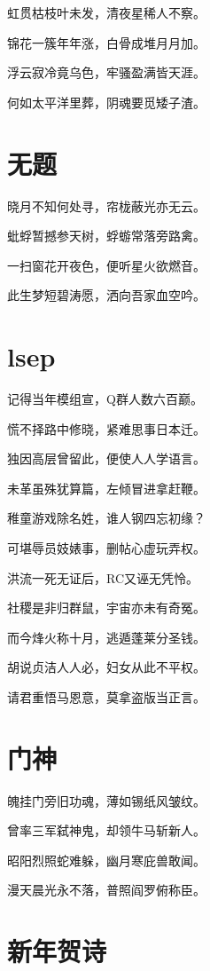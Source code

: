 \documentclass[
]{article}
\begin{document}
虹贯枯枝叶未发，清夜星稀人不察。

锦花一簇年年涨，白骨成堆月月加。

浮云寂冷竟乌色，牢骚盈满皆天涯。

何如太平洋里葬，阴魂要觅矮子渣。

\section{无题}\label{ux65e0ux9898-4}

晓月不知何处寻，帘栊蔽光亦无云。

蚍蜉暂撼参天树，蜉蝣常落旁路禽。

一扫窗花开夜色，便听星火欲燃音。

此生梦短碧涛愿，洒向吾家血空吟。

\section{lsep}\label{lsep}

记得当年模组宣，Q群人数六百巅。

慌不择路中修晓，紧难思事日本迁。

独因高层曾留此，便使人人学语言。

未革虽殊犹算篇，左倾冒进拿赶鞭。

稚童游戏除名姓，谁人钢四忘初缘？

可堪辱员妓婊事，删帖心虚玩弄权。

洪流一死无证后，RC又诬无凭怜。

社稷是非归群鼠，宇宙亦未有奇冤。

而今烽火称十月，逃遁蓬莱分圣钱。

胡说贞洁人人必，妇女从此不平权。

请君重悟马恩意，莫拿盗版当正言。

\section{门神}\label{ux95e8ux795e}

魄挂门旁旧功魂，薄如锡纸风皱纹。

曾率三军弑神鬼，却领牛马斩新人。

昭阳烈照蛇难躲，幽月寒庇兽敢闻。

漫天晨光永不落，普照阎罗俯称臣。

\section{新年贺诗}\label{ux65b0ux5e74ux8d3aux8bd7}
\end{document}
